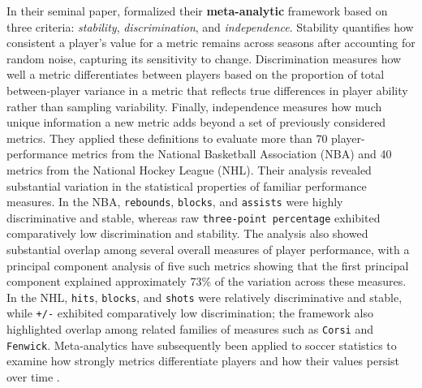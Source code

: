 \documentclass[10pt]{article}
\begin{document}
In their seminal paper, \cite{franks_meta-analytics_2016} formalized their \textbf{meta-analytic} framework based on three criteria: \textit{stability}, \textit{discrimination}, and \textit{independence}.
Stability quantifies how consistent a player’s value for a metric remains across seasons after accounting for random noise, capturing its sensitivity to change.
Discrimination measures how well a metric differentiates between players based on the proportion of total between-player variance in a metric that reflects true differences in player ability rather than sampling variability.
Finally, independence measures how much unique information a new metric adds beyond a set of previously considered metrics.
They applied these definitions to evaluate more than 70 player-performance metrics from the National Basketball Association (NBA) and 40 metrics from the National Hockey League (NHL).
Their analysis revealed substantial variation in the statistical properties of familiar performance measures.
In the NBA, \texttt{rebounds}, \texttt{blocks}, and \texttt{assists} were highly discriminative and stable, whereas raw \texttt{three-point percentage} exhibited comparatively low discrimination and stability.
The analysis also showed substantial overlap among several overall measures of player performance, with a principal component analysis of five such metrics showing that the first principal component explained approximately 73\% of the variation across these measures.
In the NHL, \texttt{hits}, \texttt{blocks}, and \texttt{shots} were relatively discriminative and stable, while \texttt{+/-} exhibited comparatively low discrimination; the framework also highlighted overlap among related families of measures such as \texttt{Corsi} and \texttt{Fenwick}.
Meta-analytics have subsequently been applied to soccer statistics to examine how strongly metrics differentiate players and how their values persist over time \citep{elhabr_tonys_2023}.
\end{document}
